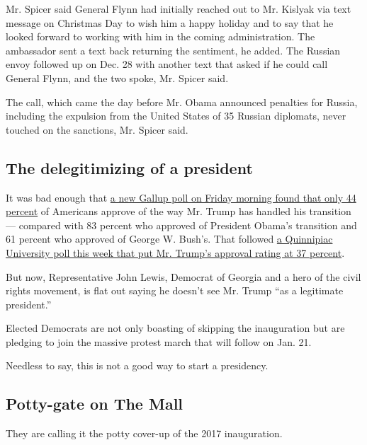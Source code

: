 Mr. Spicer said General Flynn had initially reached out to Mr. Kislyak
via text message on Christmas Day to wish him a happy holiday and to say
that he looked forward to working with him in the coming administration.
The ambassador sent a text back returning the sentiment, he added. The
Russian envoy followed up on Dec. 28 with another text that asked if he
could call General Flynn, and the two spoke, Mr. Spicer said.

The call, which came the day before Mr. Obama announced penalties for
Russia, including the expulsion from the United States of 35 Russian
diplomats, never touched on the sanctions, Mr. Spicer said.

\hypertarget{the-delegitimizing-of-a-president}{%
\subsection{The delegitimizing of a
president}\label{the-delegitimizing-of-a-president}}

It was bad enough that
\href{http://www.gallup.com/poll/201833/approval-trump-transition-low-inauguration-nears.aspx?utm_source=twitterbutton\&utm_medium=twitter\&utm_campaign=sharing}{a
new Gallup poll on Friday morning found that only 44 percent} of
Americans approve of the way Mr. Trump has handled his transition ---
compared with 83 percent who approved of President Obama's transition
and 61 percent who approved of George W. Bush's. That followed
\href{https://poll.qu.edu/national/release-detail?ReleaseID=2415}{a
Quinnipiac University poll this week that put Mr. Trump's approval
rating at 37 percent}.

But now, Representative John Lewis, Democrat of Georgia and a hero of
the civil rights movement, is flat out saying he doesn't see Mr. Trump
``as a legitimate president.''

Elected Democrats are not only boasting of skipping the inauguration but
are pledging to join the massive protest march that will follow on Jan.
21.

Needless to say, this is not a good way to start a presidency.

\hypertarget{potty-gate-on-the-mall}{%
\subsection{Potty-gate on The Mall}\label{potty-gate-on-the-mall}}

They are calling it the potty cover-up of the 2017 inauguration.

